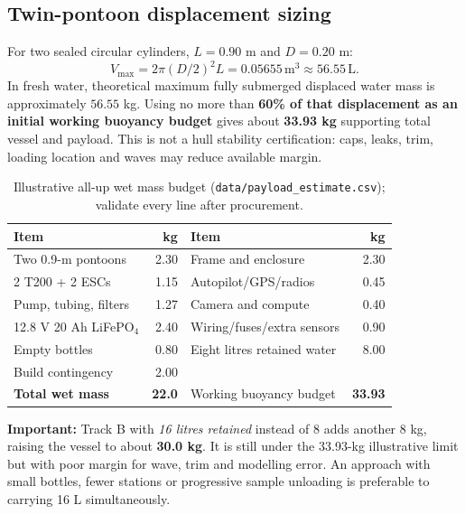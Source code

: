 \documentclass[10pt,a4paper]{article}
\begin{document}
\subsection{Twin-pontoon displacement sizing}
For two sealed circular cylinders, $L=0.90$ m and $D=0.20$ m:
\[V_{\max}=2\pi(D/2)^2L=0.05655\,\mathrm{m}^3\approx56.55\,\mathrm{L}.\]
In fresh water, theoretical maximum fully submerged displaced water mass is approximately $56.55$ kg. Using no more than \textbf{60\% of that displacement as an initial working buoyancy budget} gives about \textbf{33.93 kg} supporting total vessel and payload. This is not a hull stability certification: caps, leaks, trim, loading location and waves may reduce available margin.
\begin{table}[H]\centering\footnotesize
\caption{Illustrative all-up wet mass budget (\texttt{data/payload\_estimate.csv}); validate every line after procurement.}
\begin{tabularx}{\linewidth}{@{}Y r Y r@{}}\toprule
Item & kg & Item & kg\\\midrule
Two 0.9-m pontoons & 2.30 & Frame and enclosure & 2.30\\
2 T200 + 2 ESCs & 1.15 & Autopilot/GPS/radios & 0.45\\
Pump, tubing, filters & 1.27 & Camera and compute & 0.40\\
12.8 V 20 Ah LiFePO$_4$ & 2.40 & Wiring/fuses/extra sensors & 0.90\\
Empty bottles & 0.80 & Eight litres retained water & 8.00\\
Build contingency & 2.00 & & \\\midrule
\textbf{Total wet mass} & \textbf{22.0} & Working buoyancy budget & \textbf{33.93}\\\bottomrule\end{tabularx}\end{table}
\textbf{Important:} Track B with \emph{16 litres retained} instead of 8 adds another 8 kg, raising the vessel to about \textbf{30.0 kg}. It is still under the 33.93-kg illustrative limit but with poor margin for wave, trim and modelling error. An approach with small bottles, fewer stations or progressive sample unloading is preferable to carrying 16 L simultaneously.
\end{document}
